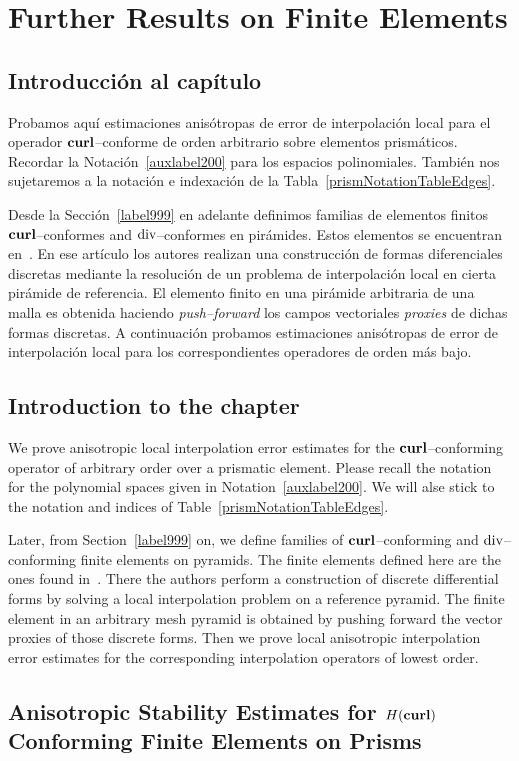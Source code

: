 \chapter{Further Results on Finite Elements}
\label{auxlabel202}
\section*{Introducci\'on al cap\'itulo}
Probamos aqu\'i estimaciones anis\'otropas de error de interpolaci\'on local
para el operador $\textbf{curl}$--conforme de orden arbitrario sobre elementos
prism\'aticos.
Recordar la Notaci\'on~\ref{auxlabel200} para los espacios polinomiales. 
Tambi\'en nos sujetaremos a la notaci\'on e indexaci\'on de la  
Tabla~\ref{prismNotationTableEdges}.

Desde la Secci\'on~\ref{label999} en adelante definimos
familias de elementos finitos 
$\textbf{curl}$--conformes and $\operatorname{\textrm{div}}$--conformes en pir\'amides. Estos elementos
se encuentran en~\cite{gh99}. En ese art\'iculo los autores
realizan una construcci\'on de formas diferenciales discretas
mediante la resoluci\'on de un problema de interpolaci\'on local
en cierta pir\'amide de referencia. El elemento finito en una
pir\'amide arbitraria de una malla es obtenida haciendo \emph{push--forward}
los campos vectoriales \emph{proxies} de dichas formas discretas.
A continuaci\'on probamos estimaciones anis\'otropas de error de interpolaci\'on
local para los correspondientes operadores de orden m\'as bajo.

\section*{Introduction to the chapter}
We prove anisotropic local interpolation error estimates for the
$\textbf{curl}$--conforming operator of arbitrary order over a prismatic element.
Please recall 
the notation for the polynomial spaces given in Notation~\ref{auxlabel200}. We 
will alse stick to the notation and indices of 
Table~\ref{prismNotationTableEdges}.

Later, from Section~\ref{label999} on, we define families of
$\textbf{curl}$--conforming and $\operatorname{\textrm{div}}$--conforming finite elements on pyramids.
The finite elements defined here 
are the ones found in~\cite{gh99}. There the authors
perform a
construction of discrete differential
forms by solving a local interpolation problem on a reference pyramid. The
finite element in an arbitrary mesh pyramid is obtained by pushing forward
the vector proxies of those discrete forms.
Then we prove local anisotropic interpolation error estimates for the
corresponding interpolation operators of lowest order.

\section{An\-iso\-tropic Stability Estimates for $H(\textbf{curl})$ Conforming Finite
Elements on Prisms}
\label{stab_edge_prism}





